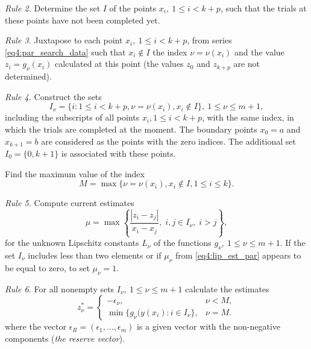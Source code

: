 \documentclass[graybox]{svmult}
\begin{document}
\emph{Rule 2.} Determine the set $I$ of the points $x_i,\: 1\le i<k+p$, such that the trials at these points have not been completed yet.

\emph{Rule 3.} Juxtapose to each point $x_i,\: 1\le i<k+p$, from series \eqref{eq4:par_search_data} such that $x_i\not\in I$ the
index $\nu=\nu(x_i)$ and the value $z_i=g_\nu(x_i )$ calculated at this point (the values $z_0$ and $z_{k + p}$ are not determined).

\emph{Rule 4.} Construct the sets
\begin{equation}
  I_\nu=\{i:1\le i<k+p, \nu=\nu(x_i),x_i\not\in I\},\:1\le\nu\le m+1,
\end{equation}
including the subscripts of all points $x_i ,1\le i<k+p$, with the same index, in which the trials are completed at the moment. The boundary points $x_0=a$ and $x_{k + 1}=b$ are considered as the points with the zero indices. The additional set $I_0=\{0,k+1\}$ is associated with these points.

Find the maximum value of the index
\begin{equation}
  M=\max\{\nu=\nu(x_i),x_i\not\in I,1\le i \le k\}.
\end{equation}

\emph{Rule 5.} Compute current estimates
\begin{equation}
  \label{eq4:lip_est_par}
  \mu = \max\left\{ \frac{\left|z_i-z_j\right|}{ x_i - x_j }, \; i,j \in I_\nu, \; i>j \right\},
\end{equation}
for the unknown Lipschitz constants $L_\nu$ of the functions $g_\nu,\: 1\le\nu\le m+1$. If the set $I_\nu$ includes less than two elements or if $\mu_\nu$ from \eqref{eq4:lip_est_par} appears to be equal to zero, to set $\mu_\nu=1$.

\emph{Rule 6.} For all nonempty sets $I_\nu,\: 1\le\nu\le m+1$ calculate the estimates
\begin{equation}
  \label{eq4:z_const_par}
  z_\nu^\ast = \left\{
  \begin{array}{lr}
    -\epsilon_\nu, & \nu < M,\\
    \min\{ g_\nu(y(x_i): i\in I_\nu \}, & \nu = M.
  \end{array}
  \right.
\end{equation}
where the vector $\epsilon_R=(\epsilon_1 ,\dots, \epsilon_m )$ is a given vector with the non-negative components (\emph{the reserve vector}).
\end{document}
